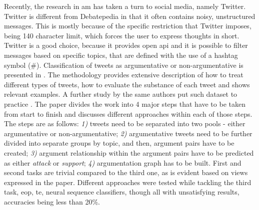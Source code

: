         Recently, the research in \gls{am} has taken a turn to social media, namely Twitter. Twitter is different from Debatepedia in that it often contains noisy, unstructured messages. This is mostly because of the specific restriction that Twitter imposes, being 140 character limit, which forces the user to express thoughts in short. Twitter is a good choice, because it provides open \gls{api} and it is possible to filter messages based on specific topics, that are defined with the use of a hashtag symbol (\#). Classification of tweets as argumentative or non-argumentative is presented in \autocite{Bosc2016DARTAD}. The methodology provides extensive description of how to treat different types of tweets, how to evaluate the substance of each tweet and shows relevant examples. A further study by the same authors put such dataset to practice \autocite{Bosc2016TweetiesSP}. The paper divides the work into 4 major steps that have to be taken from start to finish and discusses different approaches within each of those steps. The steps are as follows: \textit{1)} tweets need to be separated into two pools - either argumentative or non-argumentative; \textit{2)} argumentative tweets need to be further divided into separate groups by topic, and then, argument pairs have to be created; \textit{3)} argument relationship within the argument pairs have to be predicted as either \textit{attack} or \textit{support}; \textit{4)} argumentation graph has to be built. First and second tasks are trivial compared to the third one, as is evident based on views expressed in the paper. Different approaches were tested while tackling the third task, \gls{eop}, \gls{te}, neural sequence classifiers, though all with unsatisfying results, accuracies being less than 20\%.
     
